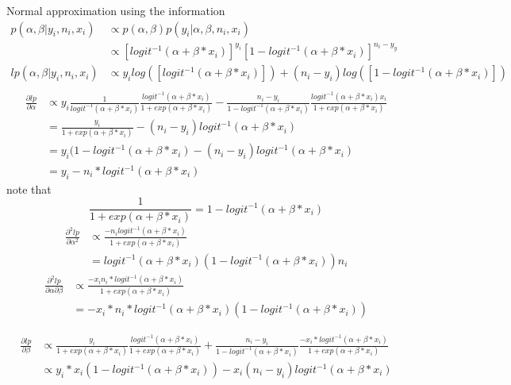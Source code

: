 \documentclass[
]{book}
\theoremstyle{definition}
\theoremstyle{definition}
\theoremstyle{definition}
\theoremstyle{definition}
\theoremstyle{remark}
\begin{document}
Normal approximation using the information
\[
\begin{aligned}
p(\alpha,\beta | y_i,n_i, x_i) &\propto p(\alpha,\beta)p(y_i | \alpha,\beta,n_i,x_i)\\
&\propto [logit^{-1}(\alpha+\beta*x_i)]^{y_i}[1-logit^{-1}(\alpha+\beta*x_i)]^{n_i-y_y}\\
lp(\alpha,\beta | y_i,n_i, x_i) &\propto y_i log([logit^{-1}(\alpha+\beta*x_i)])+(n_i-y_i)log([1-logit^{-1}(\alpha+\beta*x_i)])\\
\end{aligned}
\]
\[
\begin{aligned}
\frac{\partial lp}{\partial\alpha} &\propto y_i\frac{1}{logit^{-1}(\alpha+\beta*x_i)}\frac{logit^{-1}(\alpha+\beta*x_i)}{1+exp(\alpha+\beta*x_i)}-\frac{n_i-y_i}{1-logit^{-1}(\alpha+\beta*x_i)}\frac{logit^{-1}(\alpha+\beta*x_i)x_i}{1+exp(\alpha+\beta*x_i)}\\
&=\frac{y_i}{1+exp(\alpha+\beta*x_i)} - (n_i -y_i)logit^{-1}(\alpha+\beta*x_i) \\
& = y_i(1-logit^{-1}(\alpha+\beta*x_i) - (n_i -y_i)logit^{-1}(\alpha+\beta*x_i) \\ 
&= y_i - n_i*logit^{-1}(\alpha+\beta*x_i)
\end{aligned}
\]
note that
\begin{equation}
\frac{1}{1+exp(\alpha+\beta*x_i)} =1-logit^{-1}(\alpha+\beta*x_i)
\end{equation}
\[
\begin{aligned}
\frac{\partial^2 lp}{\partial\alpha^2} &\propto \frac{-n_i logit^{-1}(\alpha+\beta*x_i)}{1+exp(\alpha+\beta*x_i)}\\
&= logit^{-1}(\alpha+\beta*x_i)(1-logit^{-1}(\alpha+\beta*x_i))n_i
\end{aligned}
\]
\[
\begin{aligned}
\frac{\partial^2 lp}{\partial\alpha \partial \beta} &\propto \frac{-x_in_i*logit^{-1}(\alpha+\beta*x_i)}{1+exp(\alpha+\beta*x_i)}\\
&= -x_i*n_i*logit^{-1}(\alpha+\beta*x_i)(1-logit^{-1}(\alpha+\beta*x_i))
\end{aligned}
\]

\[
\begin{aligned}
\frac{\partial lp}{\partial \beta} &\propto \frac{y_i}{1+exp(\alpha+\beta*x_i)}\frac{logit^{-1}(\alpha+\beta*x_i)}{1+exp(\alpha+\beta*x_i)} + \frac{n_i-y_i}{1-logit^{-1}(\alpha+\beta*x_i)}\frac{-x_i*logit^{-1}(\alpha+\beta*x_i)}{1+exp(\alpha+\beta*x_i)}\\
&\propto y_i*x_i(1-logit^{-1}(\alpha+\beta*x_i))-x_i(n_i-y_i)logit^{-1}(\alpha+\beta*x_i)
\end{aligned}
\]
\end{document}
